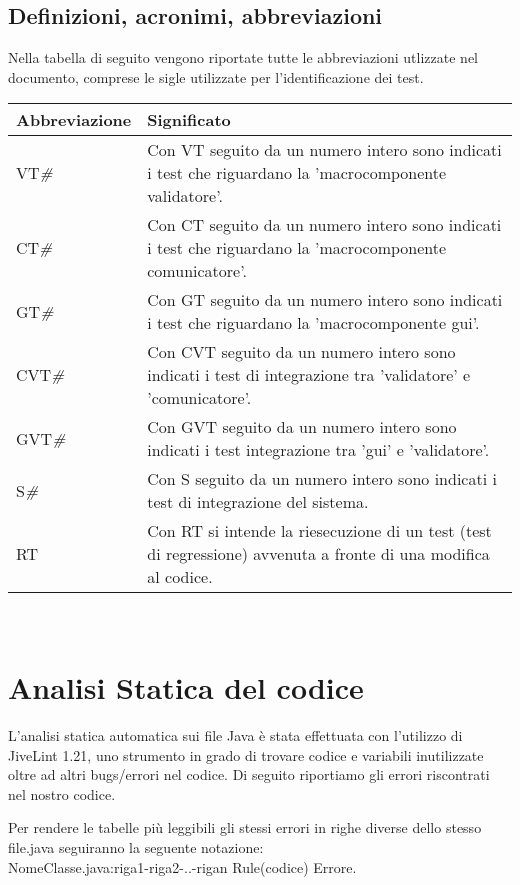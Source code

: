 \section{Definizioni, acronimi, abbreviazioni}
Nella tabella di seguito vengono riportate tutte le abbreviazioni utlizzate nel documento, comprese le sigle utilizzate per l'identificazione dei test.
\begin{center}
\begin{tabular}{|p{3.0cm}|p{8.5cm}|} \hline
\textbf{Abbreviazione} & \textbf{Significato} \\ \hline

VT\textit{\#} & Con VT seguito da un numero intero sono indicati i test che riguardano la 'macrocomponente validatore'.\\ \hline
CT\textit{\#} & Con CT seguito da un numero intero sono indicati i test che riguardano la 'macrocomponente comunicatore'.\\ \hline
GT\textit{\#} & Con GT seguito da un numero intero sono indicati i test che riguardano la 'macrocomponente gui'.\\ \hline
CVT\textit{\#} & Con CVT seguito da un numero intero sono indicati i test di integrazione tra 'validatore' e 'comunicatore'.\\ \hline
GVT\textit{\#} & Con GVT seguito da un numero intero sono indicati i test integrazione tra 'gui' e 'validatore'.\\ \hline
S\textit{\#} & Con S seguito da un numero intero sono indicati i test di integrazione del sistema.\\ \hline
RT\textit{} & Con RT si intende la riesecuzione di un test (test di regressione) avvenuta a fronte di una modifica al codice.\\ \hline

\end{tabular} \\
\end{center}

\chapter{Analisi Statica del codice}

L'analisi statica automatica sui file Java \`e stata effettuata con l'utilizzo di JiveLint 1.21, uno strumento in grado di trovare codice e variabili inutilizzate oltre ad altri bugs/errori nel codice.
Di seguito riportiamo gli errori riscontrati nel nostro codice.

Per rendere le tabelle pi\`u leggibili gli stessi errori in righe diverse dello stesso file.java seguiranno la seguente notazione: \\
NomeClasse.java:riga1-riga2-..-rigan Rule(codice) Errore. \\

